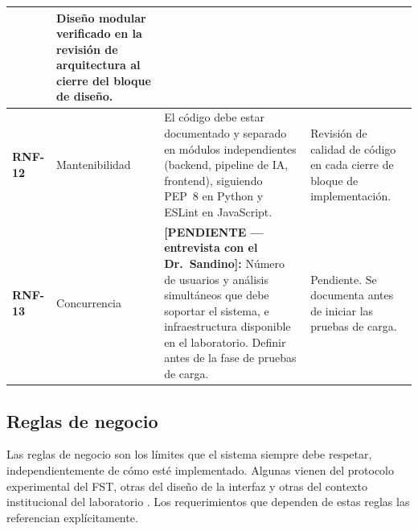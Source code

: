 \begin{longtable}{|>{\bfseries}p{1.1cm}|p{1.8cm}|p{5.9cm}|p{4.3cm}|}
       & Diseño modular verificado en la revisión de arquitectura al cierre
         del bloque de diseño. \\
\hline
RNF-12 & Mantenibilidad
       & El código debe estar documentado y separado en módulos independientes
         (backend, pipeline de IA, frontend), siguiendo PEP~8 en Python y ESLint
         en JavaScript.
       & Revisión de calidad de código en cada cierre de bloque de
         implementación. \\
\hline
RNF-13 & Concurrencia
       & \textbf{[PENDIENTE — entrevista con el Dr.\ Sandino]:} Número de
         usuarios y análisis simultáneos que debe soportar el sistema, e
         infraestructura disponible en el laboratorio. Definir antes de la
         fase de pruebas de carga.
       & Pendiente. Se documenta antes de iniciar las pruebas de carga. \\
\hline

\end{longtable}

\subsection{Reglas de negocio}

Las reglas de negocio son los límites que el sistema siempre debe respetar,
independientemente de cómo esté implementado. Algunas vienen del protocolo
experimental del FST, otras del diseño de la interfaz y otras del contexto
institucional del laboratorio \cite{pressman2014}. Los requerimientos que dependen
de estas reglas las referencian explícitamente.

